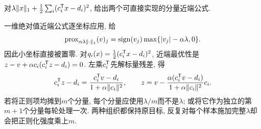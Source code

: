 \begin{example}
对$\lambda\lVert x\rVert_1+\frac12\sum_i(c_i^{\mathsf T} x-d_i)^2$, 给出两个可直接实现的分量近端公式.
\end{example}
\begin{solution}
一维绝对值近端公式逐坐标应用, 给
\[
 \operatorname{prox}_{\alpha\lambda\lVert \cdot\rVert_1}(v)_j
 =\operatorname{sign}(v_j)\max\{|v_j|-\alpha\lambda,0\}.
\]
因此小坐标直接被置零. 对$q_i(x)=\frac12(c_i^{\mathsf T} x-d_i)^2$, 近端最优性是$z-v+\alpha c_i(c_i^{\mathsf T} z-d_i)=0$. 左乘$c_i^{\mathsf T}$先解标量残差, 得
\[
 c_i^{\mathsf T} z-d_i=\frac{c_i^{\mathsf T} v-d_i}{1+\alpha\lVert c_i\rVert^2},\qquad
 z=v-\frac{\alpha(c_i^{\mathsf T} v-d_i)}{1+\alpha\lVert c_i\rVert^2}c_i.
\]
若将正则项均摊到$m$个分量, 每个分量应使用$\lambda/m$而不是$\lambda$; 或将它作为独立的第$m+1$个分量每轮处理一次. 两种组织都保持原目标, 反复对每个样本施加完整$\lambda$却会把正则化强度乘上$m$.
\end{solution}
